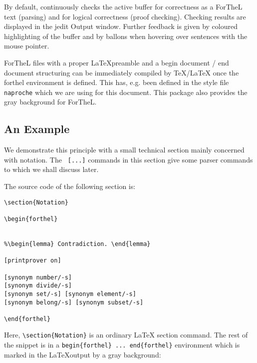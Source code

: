 \documentclass[11pt]{article}
\begin{document}
By default, \Naproche{} continuously checks the active buffer for correctness
as a ForTheL text (parsing) and for logical correctness (proof checking). 
Checking results are displayed in the jedit Output window.
Further feedback is given by coloured highlighting of the buffer and by
ballons when hovering over sentences with the mouse pointer.

ForTheL files with a proper \LaTeX preamble and a begin document 
/ end document structuring can be immediately compiled by \TeX/\LaTeX
once the forthel environment is defined. This has, e.g. been defined in the style
file \verb_naproche_ which we are using for this document. This package
also provides the gray background for ForTheL.  

\subsection{An Example}

We demonstrate this principle with a small technical section 
mainly concerned with notation. The \verb+ [...]+ commands in
this section give some parser commands to \Naproche{} which we shall 
discuss later.

The source code of the following section is:
\begin{verbatim}
\section{Notation}

\begin{forthel}


%\begin{lemma} Contradiction. \end{lemma}

[printprover on]

[synonym number/-s]
[synonym divide/-s]
[synonym set/-s] [synonym element/-s] 
[synonym belong/-s] [synonym subset/-s]

\end{forthel}
\end{verbatim}

Here, \verb+\section{Notation}+ is an ordinary \LaTeX
section command. The rest of the snippet is in a
{\verb_begin{forthel} ... end{forthel}_} environment
which is marked in the \LaTeX output by 
a gray background:
\end{document}
